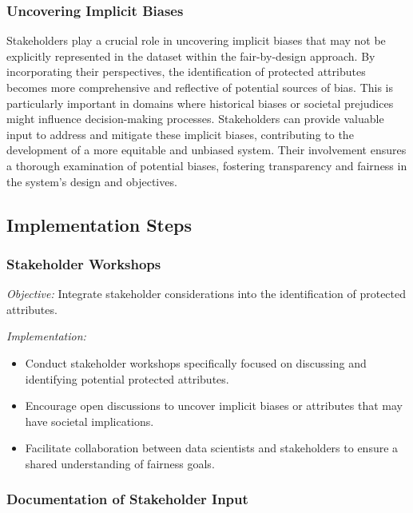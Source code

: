 \subsubsection{Uncovering Implicit Biases}

Stakeholders play a crucial role in uncovering implicit biases that may not be explicitly represented in the dataset within the fair-by-design approach. By incorporating their perspectives, the identification of protected attributes becomes more comprehensive and reflective of potential sources of bias. This is particularly important in domains where historical biases or societal prejudices might influence decision-making processes. Stakeholders can provide valuable input to address and mitigate these implicit biases, contributing to the development of a more equitable and unbiased system. Their involvement ensures a thorough examination of potential biases, fostering transparency and fairness in the system's design and objectives.

\subsection{Implementation Steps}

\subsubsection{Stakeholder Workshops}

\emph{Objective:} Integrate stakeholder considerations into the identification of protected attributes.

\emph{Implementation:}

\begin{itemize}

    \item Conduct stakeholder workshops specifically focused on discussing and identifying potential protected attributes.

    \item Encourage open discussions to uncover implicit biases or attributes that may have societal implications.

    \item Facilitate collaboration between data scientists and stakeholders to ensure a shared understanding of fairness goals.

\end{itemize}

\subsubsection{Documentation of Stakeholder Input}

